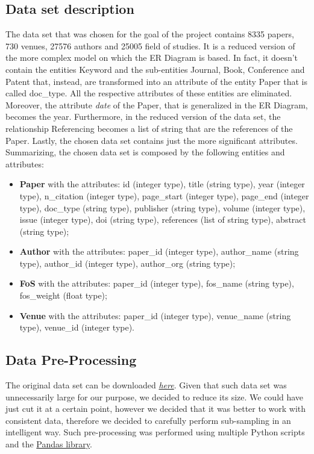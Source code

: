 \documentclass{Configuration_Files/PoliMi3i_thesis}
\begin{document}
\subsection{Data set description}
The data set that was chosen for the goal of the project contains 8335 papers, 730 venues, 27576 authors and 25005 field of studies. It is a reduced version of the more complex model on which the ER Diagram is based. In fact, it doesn't contain the entities Keyword and the sub-entities Journal, Book, Conference and Patent that, instead, are transformed into an attribute of the entity Paper that is called doc\_type. All the respective attributes of these entities are eliminated. Moreover, the attribute \textit{date} of the Paper, that is generalized in the ER Diagram, becomes the year. Furthermore, in the reduced version of the data set, the relationship Referencing becomes a list of string that are the references of the Paper. Lastly, the chosen data set contains just the more significant attributes. 
Summarizing, the chosen data set is composed by the following entities and attributes:
\begin{itemize}
    \item \textbf{Paper} with the attributes: id (integer type), title (string type), year (integer type), n\_citation (integer type), page\_start (integer type), page\_end (integer type), doc\_type (string type), publisher (string type), volume (integer type), issue (integer type), doi (string type), references (list of string type), abstract (string type);
    \item \textbf{Author} with the attributes: paper\_id (integer type), author\_name (string type), author\_id (integer type), author\_org (string type);
    \item \textbf{FoS} with the attributes: paper\_id (integer type), fos\_name (string type), fos\_weight (float type);
    \item \textbf{Venue} with the attributes: paper\_id (integer type), venue\_name (string type), venue\_id (integer type).
\end{itemize}
\subsection{Data Pre-Processing}
The original data set can be downloaded \href{https://lfs.AMiner.cn/misc/dblp.v11.zip}{\textit{here}}. 
Given that such data set was unnecessarily large for our purpose, we decided to reduce its size. We could have just cut it at a certain point, however we decided that it was better to work with consistent data, therefore we decided to carefully perform sub-sampling in an intelligent way. Such pre-processing was performed using multiple Python scripts and the \href{https://pandas.pydata.org/}{Pandas library}. 
\end{document}
